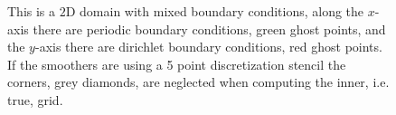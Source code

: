 		\begin{figure}
			\centering
			
			\label{fig:mixed}
			\caption{This is a \(2\)D domain with mixed boundary conditions, along the $x$-axis there are
			periodic boundary conditions, green ghost points, and the $y$-axis there are dirichlet boundary conditions, red ghost points. If
			the smoothers are using a 5 point discretization stencil the corners, grey diamonds, are neglected when
			computing the inner, i.e. true,  grid.}
		\end{figure}




